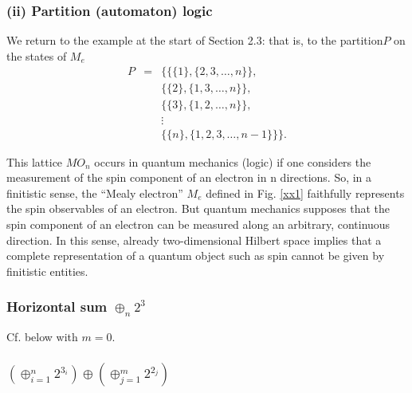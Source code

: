 \subsubsection*{(ii) Partition (automaton) logic}
We return to the example at the start of Section
2.3: that is, to the partition$P$ on the states of $M_e$
\begin{eqnarray*}
P&=&\{
\{\{1\},\{2,3,\ldots, n\}\},       \\
&&\{\{2\},\{1,3,\ldots ,n\}\},       \\
&&\{\{3\},\{1,2, \ldots,n\}\},       \\
&&\vdots \\
&&\{\{n\},\{1,2,3,\ldots , n-1\}\}
\}.
\end{eqnarray*}


This lattice $MO_n$ occurs in quantum mechanics (logic) if one considers
the
measurement of the spin component of an electron in n directions.  So,
in a finitistic sense,
the ``Mealy electron'' $M_e$ defined in Fig. \ref{xx1} faithfully
represents the spin observables of an electron.
But  quantum mechanics supposes that the spin component of an electron
can be measured along an  arbitrary, continuous direction.  In this
sense, already two-dimensional Hilbert space implies that a complete
representation
of a quantum object such as spin cannot be given by finitistic entities.





\clearpage
\subsubsection{Horizontal sum $\oplus_n 2^3$}
Cf. below with $m=0$.
\subsubsection{$(\oplus_{i=1}^n 2^{3_i})\oplus (\oplus_{j=1}^m 2^{2_j})$}

